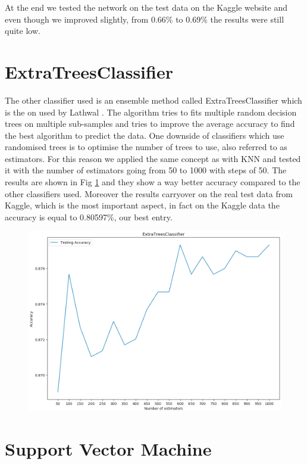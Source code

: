 \documentclass[a4paper, 11pt]{article}
\begin{document}
At the end we tested the network on the test data on the Kaggle website and even though we improved slightly, from 0.66\% to 0.69\% the results were still quite low.

\section*{ExtraTreesClassifier}
The other classifier used is an ensemble method called ExtraTreesClassifier which is the on used by Lathwal \cite{code}. The algorithm tries to fits multiple random decision trees on multiple sub-samples and tries to improve the average accuracy to find the best algorithm to predict the data. One downside of classifiers which use randomised trees is to optimise the number of trees to use, also referred to as estimators. For this reason we applied the same concept as with KNN and tested it with the number of estimators going from 50 to 1000 with steps of 50. The results are shown in Fig \ref{trees} and they show a way better accuracy compared to the other classifiers used. Moreover the results carryover on the real test data from Kaggle, which is the most important aspect, in fact on the Kaggle data the accuracy is equal to 0.80597\%, our best entry.

\begin{figure}
\centering
  \includegraphics[width=1\textwidth]{img/extra_trees}
  \label{trees}
\end{figure}

\section*{Support Vector Machine}
\end{document}
